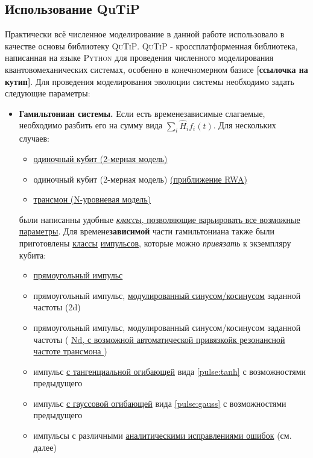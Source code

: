 \documentclass[12pt, twoside]{report}
\numberwithin{equation}{section}
\numberwithin{figure}{section}
\begin{document}
\subsection{Использование QuTiP} 
Практически всё численное моделирование в данной работе использовало в качестве основы библиотеку \textsc{QuTiP}. \textsc{QuTiP} - кроссплатформенная библиотека, написанная на языке \textsc{Python} для проведения численного моделирования квантовомеханических системах, особенно в конечномерном базисе \textbf{[ссылочка на кутип]}. Для проведения моделирования эволюции системы необходимо задать следующие параметры: 
\begin{itemize}
	\item \textbf{Гамильтониан системы.} Если есть временезависимые слагаемые, необходимо разбить его на сумму вида $\sum_i \hat{H}_i f_i(t)$. Для нескольких случаев:
	\begin{itemize}
		\item \underline{одиночный кубит (2-мерная модель)}
		\item одиночный кубит (2-мерная модель) \underline{(приближение RWA)}
		\item \underline{трансмон (N-уровневая модель)}
	\end{itemize}	 были написанны удобные \underline{\textit{классы}, позволяющие варьировать все возможные} \newline \underline{параметры}. Для времене\textbf{зависимой} части гамильтониана также были приготовлены \underline{классы} \underline{импульсов}, которые можно \textit{привязать} к экземпляру кубита:
	\begin{itemize}
		\item \underline{прямоугольный импульс}
		\item прямоугольный импульс, \underline{модулированный синусом/косинусом} \newline заданной частоты (2d)
		\item прямоугольный импульс, модулированный синусом/косинусом заданной частоты ( \underline{Nd, с возможной автоматической привязкой}\newline \underline{к резонансной частоте трансмона })
		\item импульс \underline{с тангенциальной огибающей} вида \ref{pulse:tanh} с возможностями предыдущего
		\item импульс \underline{с гауссовой огибающей} вида \ref{pulse:gauss} с возможностями предыдущего
		\item импульсы с различными \underline{аналитическими исправлениями ошибок} (см. далее)

\end{itemize}
\end{itemize}
\end{document}
